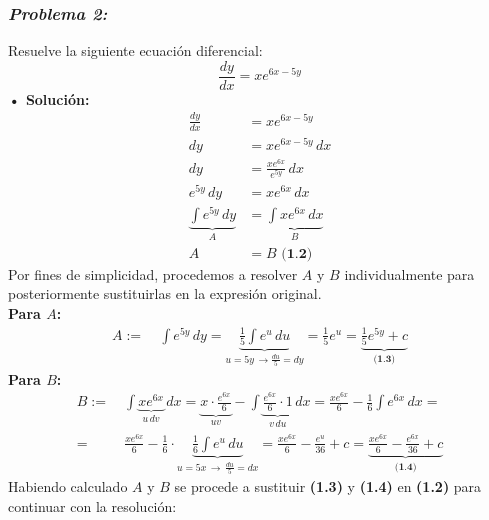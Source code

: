 \documentclass[letterpaper, 12pt]{article}
\begin{document}
\newpage
\subsubsection*{\emph{Problema 2:}}
Resuelve la siguiente ecuación diferencial:
\[\frac{dy}{dx}=xe^{6x-5y}\]
\textbf{• Solución:}
\begin{equation*}
    \begin{aligned}
        \frac{dy}{dx} &= xe^{6x-5y}\\[5pt]
        dy &= xe^{6x-5y}\, dx\\[5pt]
        dy &= \frac{xe^{6x}}{e^{5y}}\, dx\\[5pt]
        e^{5y}\, dy &= xe^{6x}\, dx\\[5pt]
        \underbrace{\int e^{5y}\, dy}_{A} &= \underbrace{\int xe^{6x}\, dx}_{B}\\[5pt]
        A &= B\,\, \textbf{(1.2)}
    \end{aligned}
\end{equation*}
\justify
Por fines de simplicidad, procedemos a resolver \(A\) y \(B\) individualmente para posteriormente sustituirlas en la expresión original.
\\\newline
\textbf{Para \(A\):}
\begin{equation*}
    \begin{aligned}
        A:=&\: \int e^{5y}\, dy=\underbrace{\frac{1}{5}\int e^{u}\, du}_{u=5y\, \rightarrow \frac{du}{5}=dy}=\frac{1}{5}e^u=\underbrace{\frac{1}{5}e^{5y}+c}_{\textbf{(1.3)}}
    \end{aligned}
\end{equation*}
\textbf{Para \(B\):}
\begin{equation*}
    \begin{aligned}
        B:=&\: \int \underbrace{xe^{6x}}_{u\, dv}\, dx = \underbrace{x\cdot \frac{e^{6x}}{6}}_{uv}-\int \underbrace{\frac{e^{6x}}{6}\cdot 1}_{v\, du}\, dx
        =\frac{xe^{6x}}{6}-\frac{1}{6}\int e^{6x}\, dx =\\[5pt]
        =& \: \frac{xe^{6x}}{6}-\frac{1}{6}\cdot\underbrace{\frac{1}{6}\int e^u\, du}_{u=5x\, \rightarrow \, \frac{du}{5}=dx}
        =\frac{xe^{6x}}{6}-\frac{e^u}{36}+c=\underbrace{\frac{xe^{6x}}{6}-\frac{e^{6x}}{36}+c}_{\textbf{(1.4)}}
    \end{aligned}
\end{equation*}
Habiendo calculado \(A\) y \(B\) se procede a sustituir \textbf{(1.3)} y \textbf{(1.4)} en \textbf{(1.2)} para continuar con la resolución:
\\
\end{document}
